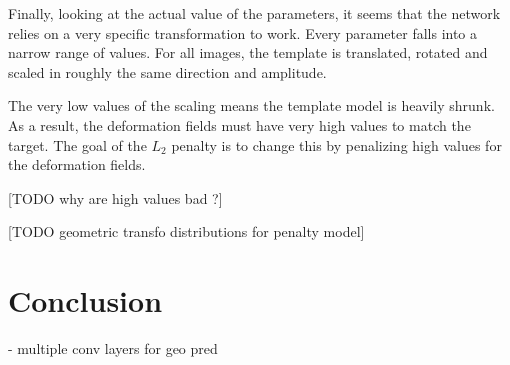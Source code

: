 Finally, looking at the actual value of the parameters, it seems that the network relies on a very specific transformation to work. Every parameter falls into a narrow range of values. For all images, the template is translated, rotated and scaled in roughly the same direction and amplitude. 

The very low values of the scaling means the template model is heavily shrunk. As a result, the deformation fields must have very high values to match the target. The goal of the $L_2$ penalty is to change this by penalizing high values for the deformation fields.

[TODO why are high values bad ?]

[TODO geometric transfo distributions for penalty model]

\section{Conclusion}

- multiple conv layers for geo pred
